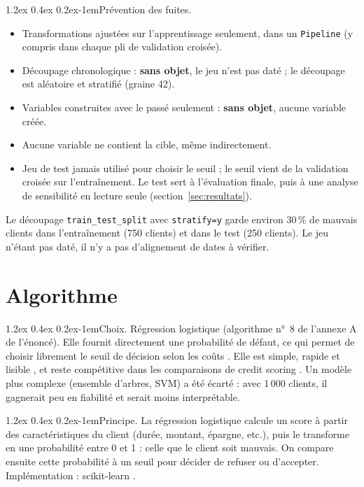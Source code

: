 \documentclass[11pt,a4paper]{article}
\makeatletter
\renewcommand\paragraph{\@startsection{paragraph}{4}{\z@}%
  {1.2ex \@plus 0.4ex \@minus 0.2ex}{-1em}{\normalfont\normalsize\bfseries}}
\makeatother
\begin{document}
\paragraph{Prévention des fuites.}
\begin{itemize}
  \item[$\boxtimes$] Transformations ajustées sur l'apprentissage seulement, dans un \texttt{Pipeline} (y compris dans chaque pli de validation croisée).
  \item[$\boxtimes$] Découpage chronologique : \textbf{sans objet}, le jeu n'est pas daté ; le découpage est aléatoire et stratifié (graine 42).
  \item[$\boxtimes$] Variables construites avec le passé seulement : \textbf{sans objet}, aucune variable créée.
  \item[$\boxtimes$] Aucune variable ne contient la cible, même indirectement.
  \item[$\boxtimes$] Jeu de test jamais utilisé pour choisir le seuil ; le seuil vient de la validation croisée sur l'entraînement. Le test sert à l'évaluation finale, puis à une analyse de sensibilité en lecture seule (section~\ref{sec:resultats}).
\end{itemize}
Le découpage \texttt{train\_test\_split} avec \texttt{stratify=y} garde environ 30\,\% de mauvais clients dans l'entraînement (750 clients) et dans le test (250 clients). Le jeu n'étant pas daté, il n'y a pas d'alignement de dates à vérifier.

\section{Algorithme}
\label{sec:algorithme}
\paragraph{Choix.} Régression logistique (algorithme n°~8 de l'annexe A de l'énoncé). Elle fournit directement une probabilité de défaut, ce qui permet de choisir librement le seuil de décision selon les coûts \cite{elkan}. Elle est simple, rapide et lisible \cite{hosmer}, et reste compétitive dans les comparaisons de credit scoring \cite{baesens}. Un modèle plus complexe (ensemble d'arbres, SVM) a été écarté : avec 1\,000 clients, il gagnerait peu en fiabilité et serait moins interprétable.

\paragraph{Principe.} La régression logistique calcule un score à partir des caractéristiques du client (durée, montant, épargne, etc.), puis le transforme en une probabilité entre 0 et 1 : celle que le client soit mauvais. On compare ensuite cette probabilité à un seuil pour décider de refuser ou d'accepter. Implémentation : scikit-learn \cite{sklearn}.
\end{document}
